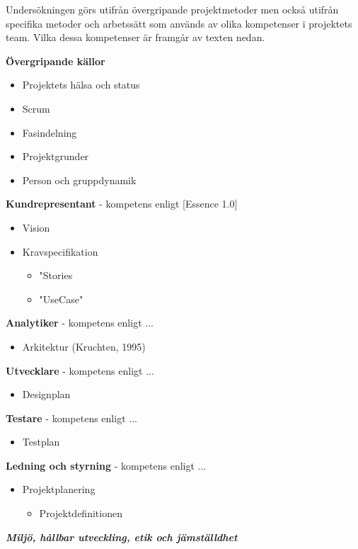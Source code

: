 \documentclass[conference]{IEEEtran}
\begin{document}
Undersökningen görs utifrån övergripande projektmetoder men också utifrån specifika metoder
och arbetssätt som används av olika kompetenser i projektets team. Vilka dessa kompetenser
är framgår av texten nedan.

\textbf{Övergripande källor}
\begin{itemize}
    \item Projektets hälsa och status
    \item Scrum
    \item Fasindelning
    \item Projektgrunder
    \item Person och gruppdynamik
\end{itemize}

\textbf{Kundrepresentant} - kompetens enligt [Essence 1.0]
\begin{itemize}
    \item Vision
    \item Kravspecifikation
    \begin{itemize}
        \item "Stories
        \item "UseCase"
    \end{itemize}
\end{itemize}

\textbf{Analytiker} - kompetens enligt ...
\begin{itemize}
    \item Arkitektur (Kruchten, 1995)
\end{itemize}

\textbf{Utvecklare} - kompetens enligt ...
\begin{itemize}
    \item Designplan
\end{itemize}

\textbf{Testare} - kompetens enligt ...
\begin{itemize}
    \item Testplan
\end{itemize}

\textbf{Ledning och styrning} - kompetens enligt ...
\begin{itemize}
    \item Projektplanering
    \begin{itemize}
        \item Projektdefinitionen
    \end{itemize}
\end{itemize}

\textit{\textbf{Miljö, hållbar utveckling, etik och jämställdhet}}
\end{document}
